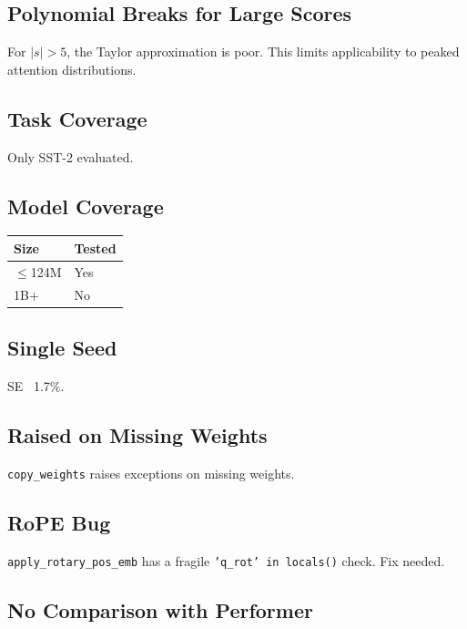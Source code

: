 \subsection{Polynomial Breaks for Large Scores}

For $|s| > 5$, the Taylor approximation is poor. This limits applicability 
to peaked attention distributions.

\subsection{Task Coverage}

Only SST-2 evaluated.

\subsection{Model Coverage}

\begin{table}[H]
\centering
\small
\begin{tabular}{ll}
\toprule
\textbf{Size} & \textbf{Tested} \\
\midrule
$\le$124M & Yes \\
1B+ & No \\
\bottomrule
\end{tabular}
\end{table}

\subsection{Single Seed}

SE ~1.7\%.

\subsection{Raised on Missing Weights}

\texttt{copy\_weights} raises exceptions on missing weights.

\subsection{RoPE Bug}

\texttt{apply\_rotary\_pos\_emb} has a fragile \texttt{'q\_rot' in locals()} check. Fix needed.

\subsection{No Comparison with Performer}

